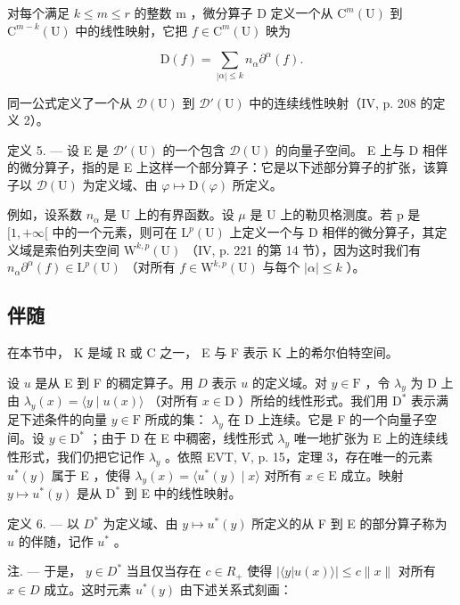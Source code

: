 对每个满足 \(k \leqslant m \leqslant r\) 的整数 m ，微分算子 D 定义一个从 \(\mathrm{C}^{m}(\mathrm{U})\) 到 \(\mathrm{C}^{m-k}(\mathrm{U})\) 中的线性映射，它把 \(f \in \mathrm{C}^{m}(\mathrm{U})\) 映为

\[
\mathrm{D} (f) = \sum_ {| \alpha | \leqslant k} n _ {\alpha} \partial^ {\alpha} (f).
\]

同一公式定义了一个从 \(\mathcal{D}(\mathrm{U})\) 到 \(\mathcal{D}'(\mathrm{U})\) 中的连续线性映射（IV, p. 208 的定义 2）。

定义 5. --- 设 E 是 \(\mathcal{D}'(\mathrm{U})\) 的一个包含 \(\mathcal{D}(\mathrm{U})\) 的向量子空间。 E 上与 D 相伴的微分算子，指的是 E 上这样一个部分算子：它是以下述部分算子的扩张，该算子以 \(\mathcal{D}(\mathrm{U})\) 为定义域、由 \(\varphi \mapsto \mathrm{D}(\varphi)\) 所定义。

例如，设系数 \(n_{\alpha}\) 是 U 上的有界函数。设 \(\mu\) 是 U 上的勒贝格测度。若 p 是 \([1,+\infty[\) 中的一个元素，则可在 \(\mathrm{L}^{p}(\mathrm{U})\) 上定义一个与 D 相伴的微分算子，其定义域是索伯列夫空间 \(\mathrm{W}^{k,p}(\mathrm{U})\) （IV, p. 221 的第 14 节），因为这时我们有 \(n_{\alpha}\partial^{\alpha}(f)\in\mathrm{L}^{p}(\mathrm{U})\) （对所有 \(f\in\mathrm{W}^{k,p}(\mathrm{U})\) 与每个 \(|\alpha|\leqslant k\) ）。

\subsection{伴随}

在本节中， K 是域 R 或 C 之一， E 与 F 表示 K 上的希尔伯特空间。

设 \(u\) 是从 E 到 F 的稠定算子。用 \(D\) 表示 \(u\) 的定义域。对 \(y \in \mathrm{F}\) ，令 \(\lambda_y\) 为 D 上由 \(\lambda_y(x) = \langle y \mid u(x) \rangle\) （对所有 \(x \in \mathrm{D}\) ）所给的线性形式。我们用 \(\mathrm{D}^*\) 表示满足下述条件的向量 \(y \in \mathrm{F}\) 所成的集： \(\lambda_y\) 在 D 上连续。它是 F 的一个向量子空间。设 \(y \in \mathrm{D}^*\) ；由于 D 在 E 中稠密，线性形式 \(\lambda_y\) 唯一地扩张为 E 上的连续线性形式，我们仍把它记作 \(\lambda_y\) 。依照 EVT, V, p. 15，定理 3，存在唯一的元素 \(u^*(y)\) 属于 E ，使得 \(\lambda_y(x) = \langle u^*(y) \mid x \rangle\) 对所有 \(x \in \mathrm{E}\) 成立。映射 \(y \mapsto u^*(y)\) 是从 \(\mathrm{D}^*\) 到 E 中的线性映射。

定义 6. --- 以 \(D^*\) 为定义域、由 \(y \mapsto u^*(y)\) 所定义的从 F 到 E 的部分算子称为 \(u\) 的伴随，记作 \(u^*\) 。

注. --- 于是， \(y \in D^{*}\) 当且仅当存在 \(c \in R_{+}\) 使得 \(|\langle y | u(x) \rangle| \leqslant c \|x\|\) 对所有 \(x \in D\) 成立。这时元素 \(u^{*}(y)\) 由下述关系式刻画：

